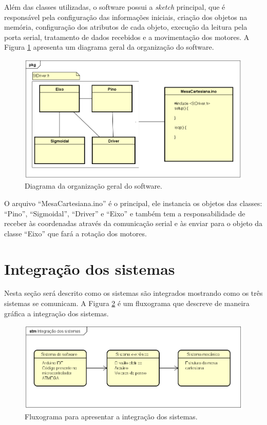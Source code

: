 Além das classes utilizadas, o software possui a \textit{sketch} principal, que é responsável 
pela configuração das informações iniciais, criação dos objetos na memória, 
configuração dos atributos de cada objeto, execução da leitura pela porta serial, 
tratamento de dados recebidos e a movimentação dos motores.
A Figura \ref{fig:orgsoftware} apresenta um diagrama geral da organização do software.

\begin{figure}[H]
\centering
\caption{Diagrama da organização geral do software.}\label{fig:orgsoftware}
\includegraphics[width = 1\linewidth]{figuras/orgsoftware}
\end{figure}
    
O arquivo “MesaCartesiana.ino” é o principal, ele instancia os objetos das classes: “Pino”, “Sigmoidal”, 
“Driver” e “Eixo” e também tem a responsabilidade de receber às coordenadas através da comunicação serial 
e às enviar para o objeto da classe “Eixo” que fará a rotação dos motores.

\section{Integração dos sistemas}\label{subsec:metintegracao}

Nesta seção será descrito como os sistemas são integrados mostrando como os três sistemas se comunicam. 
A Figura \ref{fig:integracao} é um fluxograma que descreve de maneira gráfica a integração dos sistemas.

\begin{figure}[H]
\centering
\caption{Fluxograma para apresentar a integração dos sistemas.}\label{fig:integracao}
\includegraphics[width = 1\linewidth]{figuras/integracao}
\end{figure}
    
